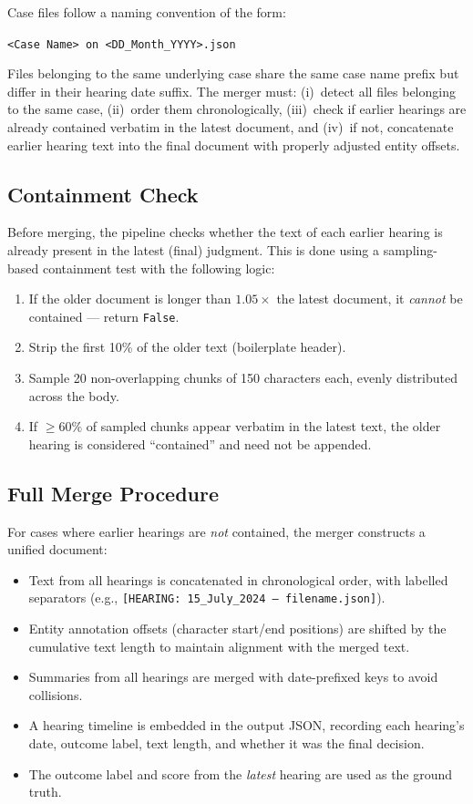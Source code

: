 Case files follow a naming convention of the form:

\begin{center}
\texttt{<Case Name> on <DD\_Month\_YYYY>.json}
\end{center}

Files belonging to the same underlying case share the same case name prefix but differ in their hearing date suffix. The merger must: (i)~detect all files belonging to the same case, (ii)~order them chronologically, (iii)~check if earlier hearings are already contained verbatim in the latest document, and (iv)~if not, concatenate earlier hearing text into the final document with properly adjusted entity offsets.

\subsection{Containment Check}

Before merging, the pipeline checks whether the text of each earlier hearing is already present in the latest (final) judgment. This is done using a sampling-based containment test with the following logic:

\begin{enumerate}
    \item If the older document is longer than $1.05\times$ the latest document, it \emph{cannot} be contained — return \texttt{False}.
    \item Strip the first 10\% of the older text (boilerplate header).
    \item Sample 20 non-overlapping chunks of 150 characters each, evenly distributed across the body.
    \item If $\geq 60\%$ of sampled chunks appear verbatim in the latest text, the older hearing is considered ``contained'' and need not be appended.
\end{enumerate}

\subsection{Full Merge Procedure}

For cases where earlier hearings are \emph{not} contained, the merger constructs a unified document:

\begin{itemize}
    \item Text from all hearings is concatenated in chronological order, with labelled separators (e.g., \texttt{[HEARING: 15\_July\_2024 --- filename.json]}).
    \item Entity annotation offsets (character start/end positions) are shifted by the cumulative text length to maintain alignment with the merged text.
    \item Summaries from all hearings are merged with date-prefixed keys to avoid collisions.
    \item A hearing timeline is embedded in the output JSON, recording each hearing's date, outcome label, text length, and whether it was the final decision.
    \item The outcome label and score from the \emph{latest} hearing are used as the ground truth.
\end{itemize}

